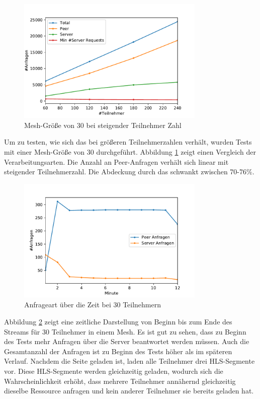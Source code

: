 \begin{figure}[!h]
	\centering
	\includegraphics[width=0.8\textwidth]{figures/meshed_30_line}
	\caption[A Figure Short-Title]{Mesh-Größe von 30 bei steigender Teilnehmer Zahl}
	\label{fig:meshed_30_line}
\end{figure}

Um zu testen, wie sich das \cdn bei größeren Teilnehmerzahlen verhält, wurden Tests mit einer Mesh-Größe von 30 durchgeführt. Abbildung \ref{fig:meshed_30_line} zeigt einen Vergleich der Verarbeitungsarten. Die Anzahl an Peer-Anfragen verhält sich linear mit steigender Teilnehmerzahl. Die Abdeckung durch das \cdn schwankt zwischen 70-76\%.


\begin{figure}[!h]
	\centering
	\includegraphics[width=0.8\textwidth]{figures/peer_vs_server_over_time}
	\caption[A Figure Short-Title]{Anfrageart über die Zeit bei 30 Teilnehmern}
	\label{fig:peer_vs_server_over_time}
\end{figure}

Abbildung \ref{fig:peer_vs_server_over_time} zeigt eine zeitliche Darstellung von Beginn bis zum Ende des Streams für 30 Teilnehmer in einem Mesh. Es ist gut zu sehen, dass zu Beginn des Tests mehr Anfragen über die Server beantwortet werden müssen. Auch die Gesamtanzahl der Anfragen ist zu Beginn des Tests höher als im späteren Verlauf. Nachdem die Seite geladen ist, laden alle Teilnehmer drei HLS-Segmente vor. Diese HLS-Segmente werden gleichzeitig geladen, wodurch sich die Wahrscheinlichkeit erhöht, dass mehrere Teilnehmer annähernd gleichzeitig dieselbe Ressource anfragen und kein anderer Teilnehmer sie bereits geladen hat. 

